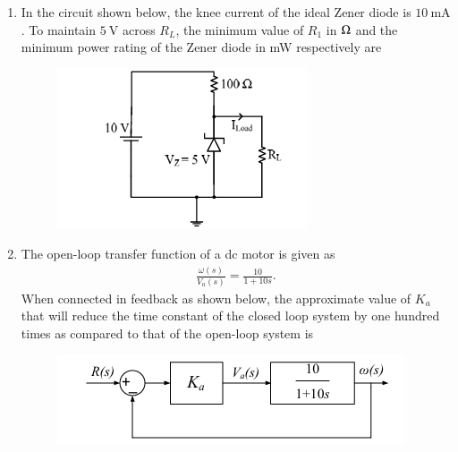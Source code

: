 \documentclass[journal,12pt,onecolumn]{IEEEtran}
\theoremstyle{remark}
\begin{document}
\begin{enumerate}
\begin{enumerate}
\end{enumerate}


\item In the circuit shown below, the knee current of the ideal Zener diode is $10~\text{mA}$. To maintain $5~\text{V}$ across $R_L$, the minimum value of $R_1$ in $\ohm$ and the minimum power rating of the Zener diode in mW respectively are
\begin{figure}[h]
    \centering
    \includegraphics[width=0.5\columnwidth]{figs/10.png}
    \label{fig:placeholder}
\end{figure}
\begin{enumerate}
\end{enumerate}


\item The open-loop transfer function of a dc motor is given as 
\begin{align*}
    \frac{\omega(s)}{V_a(s)} = \frac{10}{1+10s}.
\end{align*}
When connected in feedback as shown below, the approximate value of $K_a$ that will reduce the time constant of the closed loop system by one hundred times as compared to that of the open-loop system is
\begin{figure}[h]
    \centering
    \includegraphics[width=0.5\columnwidth]{figs/11.png}
    \label{fig:placeholder}
\end{figure}
\begin{enumerate}
\begin{multicols}{4}
    


\end{multicols}
\end{enumerate}
\end{enumerate}
\end{document}
